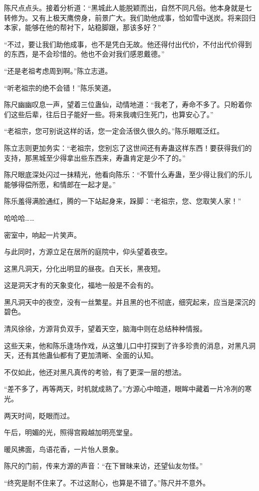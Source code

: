 \begin{this_body}
陈尺点点头。接着分析道：“黑城此人能脱颖而出，自然不同凡俗。他本身就是七转修为。又有上极天鹰傍身，前景广大。我们助他成事，恰如雪中送炭。将来回归本家，能够在他的帮衬下，站稳脚跟，那该多好？”

“不过，要让我们助他成事，也不是凭白无故。他还得付出代价，不付出代价得到的东西，是不会珍惜的。他也不会对我们感恩戴德。”

“还是老祖考虑周到啊。”陈立志道。

“听老祖宗的绝不会错！”陈乐笑道。

陈尺幽幽叹息一声，望着三位蛊仙，动情地道：“我老了，寿命不多了。只盼着你们这些后辈，往后日子能好一些。将来我魂归生死门，也算安心了。”

“老祖宗，您可别说这样的话，您一定会活很久很久的。”陈乐眼眶泛红。

陈立志则更加务实：“老祖宗，您别忘了这世间还有寿蛊这样东西！要获得我们的支持，那黑城至少得拿出些东西来，寿蛊肯定是少不了的。”

陈尺眼底深处闪过一抹精光，他看向陈乐：“不管什么寿蛊，至少得让我们的乐儿能够得偿所愿，和情郎在一起才是。”

陈乐羞得满脸通红，腾的一下站起身来，跺脚：“老祖宗，您、您取笑人家！”

哈哈哈……

密室中，响起一片笑声。

与此同时，方源立足在居所的庭院中，仰头望着夜空。

这黑凡洞天，分化出明显的昼夜。白天长，黑夜短。

这是洞天才有的天象变化，福地一般是不会有的。

黑凡洞天中的夜空，没有一丝繁星。并且黑的也不彻底，细究起来，应当是深沉的碧色。

清风徐徐，方源背负双手，望着天空，脑海中则在总结种种情报。

这些天来，他和陈乐逢场作戏，从这雏儿口中打探到了许多珍贵的消息，对黑凡洞天，还有其他蛊仙都有了更加清晰、全面的认知。

不仅如此，他还对黑凡真传的考验，有了更深一层的想法。

“差不多了，再等两天，时机就成熟了。”方源心中暗道，眼眸中藏着一片冷冽的寒光。

两天时间，眨眼而过。

午后，明媚的光，照得宫殿越加明亮堂皇。

暖风拂面，鸟语花香，一片怡人景象。

陈尺的门前，传来方源的声音：“在下冒昧来访，还望仙友勿怪。”

“终究是耐不住来了。不过这耐心，也算是不错了。”陈尺并不意外。


\end{this_body}
